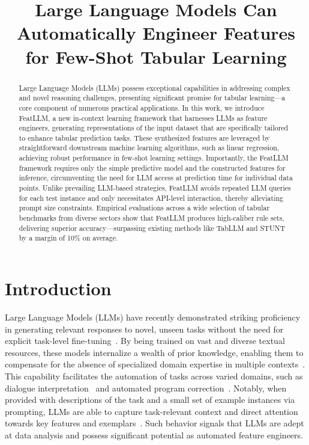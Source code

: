 \title{Large Language Models Can Automatically Engineer Features for Few-Shot Tabular Learning}

\begin{abstract}
Large Language Models (LLMs) possess exceptional capabilities in addressing complex and novel reasoning challenges, presenting significant promise for tabular learning—a core component of numerous practical applications. In this work, we introduce \textsf{FeatLLM}, a new in-context learning framework that harnesses LLMs as feature engineers, generating representations of the input dataset that are specifically tailored to enhance tabular prediction tasks. These synthesized features are leveraged by straightforward downstream machine learning algorithms, such as linear regression, achieving robust performance in few-shot learning settings. Importantly, the \textsf{FeatLLM} framework requires only the simple predictive model and the constructed features for inference, circumventing the need for LLM access at prediction time for individual data points. Unlike prevailing LLM-based strategies, \textsf{FeatLLM} avoids repeated LLM queries for each test instance and only necessitates API-level interaction, thereby alleviating prompt size constraints. Empirical evaluations across a wide selection of tabular benchmarks from diverse sectors show that \textsf{FeatLLM} produces high-caliber rule sets, delivering superior accuracy—surpassing existing methods like TabLLM and STUNT by a margin of 10\% on average.
\end{abstract}

\section{Introduction}
Large Language Models (LLMs) have recently demonstrated striking proficiency in generating relevant responses to novel, unseen tasks without the need for explicit task-level fine-tuning~\cite{creswell2022selection,imani2023mathprompter,taylor2022galactica}. By being trained on vast and diverse textual resources, these models internalize a wealth of prior knowledge, enabling them to compensate for the absence of specialized domain expertise in multiple contexts~\cite{Genomes2021,singhal2023large,wilcox2003role}. This capability facilitates the automation of tasks across varied domains, such as dialogue interpretation~\cite{finch2023leveraging} and automated program correction~\cite{fan2023automated}. Notably, when provided with descriptions of the task and a small set of example instances via prompting, LLMs are able to capture task-relevant context and direct attention towards key features and exemplars~\cite{brown2020language,zhao2023survey}. Such behavior signals that LLMs are adept at data analysis and possess significant potential as automated feature engineers.


